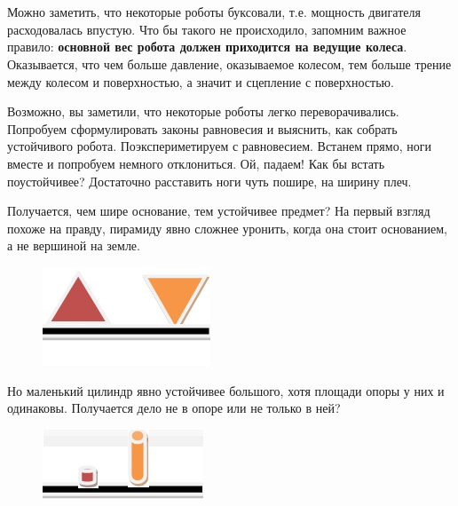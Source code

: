 {\hypertarget{lesson8x4}{}}\\\\

Можно заметить, что некоторые роботы буксовали, т.е.  мощность двигателя расходовалась впустую. Что бы такого не происходило, запомним важное правило: {\bfseries основной вес робота должен приходится на ведущие колеса}. Оказывается, что чем больше давление, оказываемое колесом, тем больше трение между колесом и поверхностью, а значит и сцепление с поверхностью.

Возможно, вы заметили, что некоторые роботы легко переворачивались. Попробуем сформулировать законы равновесия и выяснить, как собрать устойчивого робота. Поэкспериметируем с равновесием. Встанем прямо, ноги вместе и попробуем немного отклониться. Ой, падаем! Как бы встать поустойчивее? Достаточно расставить ноги чуть пошире, на ширину плеч.

Получается, чем шире основание, тем устойчивее предмет? На первый взгляд похоже на правду, пирамиду явно сложнее уронить, когда она стоит основанием, а не вершиной на земле.
\begin{figure}[h!]
	\begin{center}
		\includegraphics[width=0.35\linewidth]{chapters/chapter8/images/1}
		\caption{}
		\label{ris:image8x1}
	\end{center}
\end{figure}

Но маленький цилиндр явно устойчивее большого, хотя площади опоры у них и одинаковы. Получается дело не в опоре или не только в ней?
\begin{figure}[h!]
	\begin{center}
		\includegraphics[width=0.35\linewidth]{chapters/chapter8/images/2}
		\caption{}
		\label{ris:image8x2}
	\end{center}
\end{figure}

